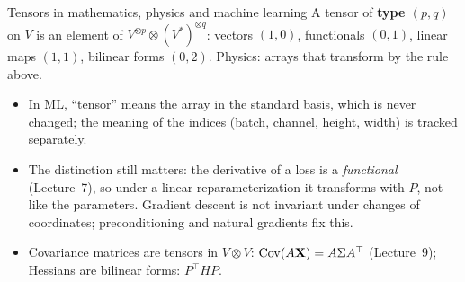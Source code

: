 \documentclass[aspectratio=1610,11pt]{beamer}
\begin{document}

\begin{frame}{Tensors in mathematics, physics and machine learning}
    \small
    A tensor of \textbf{type $(p, q)$} on $V$ is an element of $V^{\otimes p} \otimes (V^*)^{\otimes q}$: vectors $(1, 0)$, functionals $(0, 1)$, linear maps $(1, 1)$, bilinear forms $(0, 2)$. Physics: arrays that transform by the rule above.
    \begin{mlbox}
        \small
        \begin{itemize}
            \item In ML, ``tensor'' means the array in the standard basis, which is never changed; the meaning of the indices (batch, channel, height, width) is tracked separately.
            \item The distinction still matters: the derivative of a loss is a \emph{functional} (Lecture~7), so under a linear reparameterization it transforms with $P$, not like the parameters. Gradient descent is not invariant under changes of coordinates; preconditioning and natural gradients fix this.
            \item Covariance matrices are tensors in $V \otimes V$: $\operatorname{Cov}(A\mathbf{X}) = A\Sigma A^\top$ (Lecture~9); Hessians are bilinear forms: $P^\top HP$.
        \end{itemize}
    \end{mlbox}
\end{frame}
\end{document}
